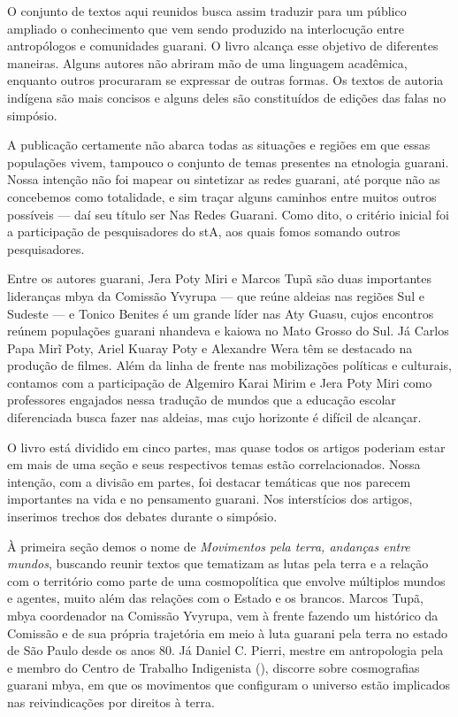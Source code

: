 O conjunto de textos aqui reunidos busca assim traduzir para um público
ampliado o conhecimento que vem sendo produzido na interlocução entre
antropólogos e comunidades guarani. O livro alcança esse objetivo de
diferentes maneiras. Alguns autores não abriram mão de uma linguagem
acadêmica, enquanto outros procuraram se expressar de outras formas. Os
textos de autoria indígena são mais concisos e alguns deles são constituídos de
edições das falas no simpósio. 

A publicação certamente não abarca todas as situações e regiões em que
essas populações vivem, tampouco o conjunto de temas presentes na
etnologia guarani. Nossa intenção não foi mapear ou sintetizar as redes
guarani, até porque não as concebemos como totalidade, e sim traçar
alguns caminhos entre muitos outros possíveis — daí seu título ser Nas
Redes Guarani. Como dito, o critério inicial foi a participação de
pesquisadores do stA, aos quais fomos somando outros pesquisadores. 

Entre os autores guarani, Jera Poty Miri e Marcos Tupã são duas
importantes lideranças mbya da Comissão Yvyrupa — que reúne aldeias nas
regiões Sul e Sudeste — e Tonico Benites é um grande líder nas Aty
Guasu, cujos encontros reúnem populações guarani nhandeva e kaiowa no
Mato Grosso do Sul. Já Carlos Papa Mirĩ Poty, Ariel Kuaray Poty e
Alexandre Wera têm se destacado na produção de filmes. Além da linha de
frente nas mobilizações políticas e culturais, contamos com a
participação de Algemiro Karai Mirim e Jera Poty Miri como professores
engajados nessa tradução de mundos que a educação escolar diferenciada
busca fazer nas aldeias, mas cujo horizonte é difícil de alcançar.

O livro está dividido em cinco partes, mas quase todos os artigos
poderiam estar em mais de uma seção e seus respectivos temas estão
correlacionados. Nossa intenção, com a divisão em partes, foi destacar
temáticas que nos parecem importantes na vida e no pensamento guarani.
Nos interstícios dos artigos, inserimos trechos dos debates durante o
simpósio.

À primeira seção demos o nome de \emph{Movimentos pela terra, andanças entre
mundos}, buscando reunir textos que tematizam as lutas pela terra e a
relação com o território como parte de uma cosmopolítica que envolve
múltiplos mundos e agentes, muito além das relações com o Estado e os
brancos. Marcos Tupã, mbya coordenador na Comissão Yvyrupa, vem à
frente fazendo um histórico da Comissão e de sua própria trajetória em
meio à luta guarani pela terra no estado de São Paulo desde os anos 80.
Já Daniel C. Pierri, mestre em antropologia pela  e membro do Centro
de Trabalho Indigenista (), discorre sobre cosmografias guarani
mbya, em que os movimentos que configuram o universo estão implicados
nas reivindicações por direitos à terra.

